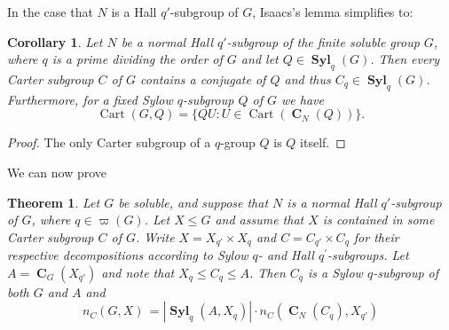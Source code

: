 \documentclass[a4paper,12pt,reqno]{amsart}
\newtheorem{prevtheorem}{Theorem}
\newtheorem{corollary}[theorem]{Corollary}
\numberwithin{equation}{section}
\DeclareMathOperator{\cart}{Cart}
\DeclareMathOperator{\cent}{\mathbf{C}}
\DeclareMathOperator{\syl}{\mathbf{Syl}}
\renewcommand{\leq}{\leqslant}
\begin{document}
In the case that $N$ is a Hall $q'$-subgroup of $G$, Isaacs's lemma  simplifies to: 
\begin{corollary}\label{Cor:IsaacsOnePrime}
Let $N$ be a normal Hall $q'$-subgroup of the finite soluble group $G$,
where $q $ is a prime dividing the order of $G$  
and let $Q \in \syl_{q}(G)$. 
Then every Carter subgroup $C$ of $G$ contains a conjugate of $Q$ and thus $C_q  \in \syl_q(G)$.
Furthermore, for a  fixed  Sylow $q$-subgroup $Q$  of $G$ 
we have 
\[
\cart(G, Q) = \{ QU : U \in \cart(\cent_N(Q))\}.
\]

\end{corollary}
\begin{proof}
The only Carter subgroup of a $q$-group $Q$  is $Q$ itself. 
\end{proof}

We can now prove 

\begin{prevtheorem}\label{Thm:EOnePrime}
Let $G$ be soluble, and suppose that $N$
	is a normal Hall $q'$-subgroup of $G$, where $q \in \varpi(G)$. 
	Let $X \leq G$ and assume that
	$X$ is contained in some Carter subgroup $C$ of $G$. 
	Write $X = X_{q'}  \times X_{q}$ and $C = C_{q'} \times C_{q}$ 
	for their respective decompositions according to Sylow $q$- and Hall $q^{\prime}$-subgroups.
 Let $A = \cent_G(X_{q'})$  and note that  $X_{q} \leq C_{q} \leq A$. Then $C_q$ is a Sylow $q$-subgroup of both  $G$ and  $A$ and  
 \begin{equation}
 n_C(G,X) \, =  |\syl_q(A, X_q)| \cdot  n_C(\cent_N(C_{q}), X_{q'})
	\end{equation}
\end{prevtheorem}
\end{document}
